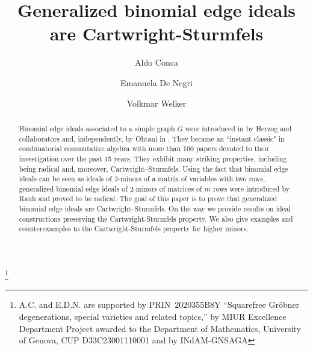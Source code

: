 \documentclass{amsart}
\theoremstyle{definition}
\numberwithin{equation}{section}
\begin{document}
\title{Generalized binomial edge ideals are Cartwright-Sturmfels}

\author{Aldo Conca}
\address{Dipartimento di Matematica, Universit\`a di Genova, Dipartimento di Eccellenza 2023-2027, Via Dodecaneso 35, I-16146 Genova, Italy}

\author{Emanuela De Negri}
\address{Dipartimento di Matematica, Universit\`a di Genova, Dipartimento di Eccellenza 2023-2027, Via Dodecaneso 35, I-16146 Genova, Italy}


\author{Volkmar Welker}
\address{Philipps Universit\"at Marbu\-rg, Fachbereich Mathematik und Informatik, 35032 Marburg, Germany }

\thanks{A.C. and E.D.N. are supported by PRIN~2020355B8Y ``Squarefree Gr\"obner degenerations, special varieties and related topics,'' by MIUR Excellence Department Project awarded to the Department of Mathematics, University of Genova, CUP D33C23001110001 and by INdAM-GNSAGA}


\begin{abstract}
Binomial edge ideals associated to a simple graph $G$ were introduced in \cite{HHHKR} by Herzog and collaborators  and, independently, by Ohtani in \cite{Ohtani}. They became an ``instant classic" in combinatorial commutative algebra with more than 100 papers devoted to their investigation over the past 15 years. They exhibit many striking properties, including being radical and, moreover, Cartwright–Sturmfels. Using the fact that binomial edge ideals can be seen as ideals of $2$-minors of a matrix of variables with two rows, generalized binomial edge ideals of $2$-minors of matrices of $m$ rows were introduced by Rauh \cite{Rauh} and proved to be radical. The goal of this paper is to prove that generalized binomial edge ideals are Cartwright–Sturmfels. On the way we provide results on ideal constructions preserving the Cartwright-Sturmfels property. We also give examples and counterexamples to
the Cartwright-Sturmfels property for higher minors.
\end{abstract}
\maketitle

\end{document}
